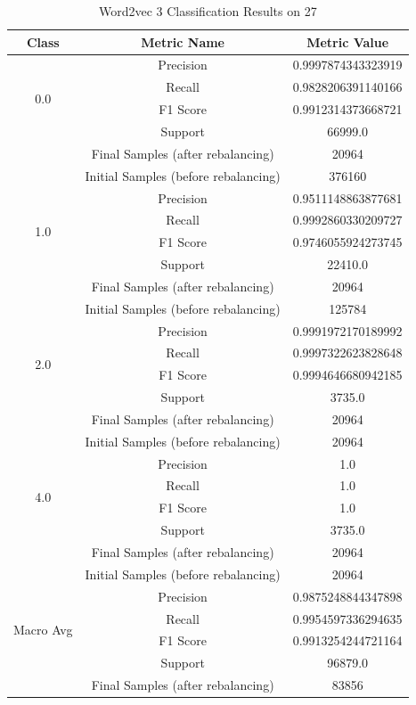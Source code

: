 \begin{longtable}{|c|c|c|}
\caption{Word2vec 3 Classification Results on 27} \label{tab:27_word2vec_3_classifiers_results} \\
\hline
Class & Metric Name & Metric Value \\
\hline
\multirow{4}{*}{0.0} & Precision & 0.9997874343323919 \\
 & Recall & 0.9828206391140166 \\
 & F1 Score & 0.9912314373668721 \\
 & Support & 66999.0 \\
 & Final Samples (after rebalancing) & 20964 \\
 & Initial Samples (before rebalancing) & 376160 \\
\hline
\multirow{4}{*}{1.0} & Precision & 0.9511148863877681 \\
 & Recall & 0.9992860330209727 \\
 & F1 Score & 0.9746055924273745 \\
 & Support & 22410.0 \\
 & Final Samples (after rebalancing) & 20964 \\
 & Initial Samples (before rebalancing) & 125784 \\
\hline
\multirow{4}{*}{2.0} & Precision & 0.9991972170189992 \\
 & Recall & 0.9997322623828648 \\
 & F1 Score & 0.9994646680942185 \\
 & Support & 3735.0 \\
 & Final Samples (after rebalancing) & 20964 \\
 & Initial Samples (before rebalancing) & 20964 \\
\hline
\multirow{4}{*}{4.0} & Precision & 1.0 \\
 & Recall & 1.0 \\
 & F1 Score & 1.0 \\
 & Support & 3735.0 \\
 & Final Samples (after rebalancing) & 20964 \\
 & Initial Samples (before rebalancing) & 20964 \\
\hline
\multirow{4}{*}{Macro Avg} & Precision & 0.9875248844347898 \\
 & Recall & 0.9954597336294635 \\
 & F1 Score & 0.9913254244721164 \\
 & Support & 96879.0 \\
 & Final Samples (after rebalancing) & 83856 \\

\end{longtable}
